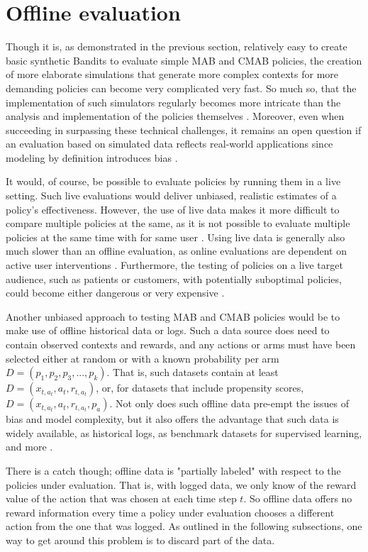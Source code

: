 \documentclass{jss}
\begin{document}
\section{Offline evaluation} \label{offl}

Though it is, as demonstrated in the previous section, relatively easy to create basic synthetic Bandits to evaluate simple MAB and CMAB policies, the creation of more elaborate simulations that generate more complex contexts for more demanding policies can become very complicated very fast. So much so, that the implementation of such simulators regularly becomes more intricate than the analysis and implementation of the policies themselves \citep{Strehl2006a}. Moreover, even when succeeding in surpassing these technical challenges, it remains an open question if an evaluation based on simulated data reflects real-world applications since modeling by definition introduces bias \citep{Li2012,Li2011}.

It would, of course, be possible to evaluate policies by running them in a live setting. Such live evaluations would deliver unbiased, realistic estimates of a policy's effectiveness. However, the use of live data makes it more difficult to compare multiple policies at the same, as it is not possible to evaluate multiple policies at the same time with for same user \citep{Mandel2016}. Using live data is generally also much slower than an offline evaluation, as online evaluations are dependent on active user interventions \citep{Tewari2017}. Furthermore, the testing of policies on a live target audience, such as patients or customers, with potentially suboptimal policies, could become either dangerous or very expensive \citep{Bastani2015}.

Another unbiased approach to testing MAB and CMAB policies would be to make use of offline historical data or logs. Such a data source does need to contain observed contexts and rewards, and any actions or arms must have been selected either at random or with a known probability per arm \( D = (p_1,p_2,p_3,...,p_k) \). That is, such datasets contain at least \( D = (x_{t,a_t},a_{t},r_{t,a_t}) \), or, for datasets that include propensity scores, \( D = (x_{t,a_t},a_{t},r_{t,a_t},p_a) \). Not only does such offline data pre-empt the issues of bias and model complexity, but it also offers the advantage that such data is widely available, as historical logs, as benchmark datasets for supervised learning, and more \citep{Li2011}.

There is a catch though; offline data is "partially labeled" with respect to the policies under evaluation\citep{Strehl2010}. That is, with logged data, we only know of the reward value of the action that was chosen at each time step $t$. So offline data offers no reward information every time a policy under evaluation chooses a different action from the one that was logged. As outlined in the following subsections, one way to get around this problem is to discard part of the data.
\end{document}
